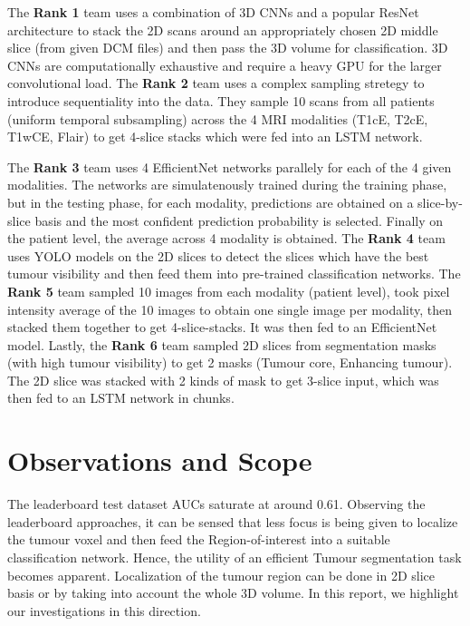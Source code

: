 \vspace*{6mm}

The \textbf{Rank 1} team uses a combination of 3D CNNs and a popular ResNet architecture to stack the 2D scans around an appropriately chosen 2D middle slice (from given DCM files) and then pass the 3D volume for classification. 3D CNNs are computationally exhaustive and require a heavy GPU for the larger convolutional load. The \textbf{Rank 2} team uses a complex sampling stretegy to introduce sequentiality into the data. They sample 10 scans from all patients (uniform temporal subsampling) across the 4 MRI modalities (T1cE, T2cE, T1wCE, Flair) to get 4-slice stacks which were fed into an LSTM network. 

\vspace*{3mm}

The \textbf{Rank 3} team uses 4 EfficientNet networks parallely for each of the 4 given modalities. The networks are simulatenously trained during the training phase, but in the testing phase, for each modality, predictions are obtained on a slice-by-slice basis and the most confident prediction probability is selected. Finally on the patient level, the average across 4 modality is obtained. The \textbf{Rank 4} team uses YOLO models on the 2D slices to detect the slices which have the best tumour visibility and then feed them into pre-trained classification networks. The \textbf{Rank 5} team sampled 10 images from each modality (patient level), took pixel intensity average of the 10 images to obtain one single image per modality, then stacked them together to get 4-slice-stacks. It was then fed to an EfficientNet model. Lastly, the \textbf{Rank 6} team sampled 2D slices from segmentation masks (with high tumour visibility) to get 2 masks (Tumour core, Enhancing tumour). The 2D slice was stacked with 2 kinds of mask to get 3-slice input, which was then fed to an LSTM network in chunks. 



\vspace*{6mm}

\hypersetup{ colorlinks=true,
    linkcolor=black,
    filecolor=magenta,      
    urlcolor=black}

\section{Observations and Scope}

The leaderboard test dataset AUCs saturate at around 0.61.
Observing the leaderboard approaches, it can be sensed that less focus is being given to localize the tumour voxel and then feed the Region-of-interest into a suitable classification network. Hence, the utility of an efficient Tumour segmentation task becomes apparent. Localization of the tumour region can be done in 2D slice basis or by taking into account the whole 3D volume. In this report, we highlight our investigations in this direction.  
\vspace{3mm}

